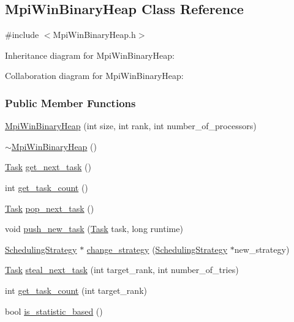 \hypertarget{a00055}{}\subsection{Mpi\+Win\+Binary\+Heap Class Reference}
\label{a00055}


{\ttfamily \#include $<$Mpi\+Win\+Binary\+Heap.\+h$>$}



Inheritance diagram for Mpi\+Win\+Binary\+Heap\+:


Collaboration diagram for Mpi\+Win\+Binary\+Heap\+:
\subsubsection*{Public Member Functions}
\begin{DoxyCompactItemize}
\item 
\hyperlink{a00055_a4a5fd6d6bbb17dae222b879232d11374}{Mpi\+Win\+Binary\+Heap} (int size, int rank, int number\+\_\+of\+\_\+processors)
\item 
\hyperlink{a00055_a907d0f48eee11b2563569fc51b6b3b6c}{$\sim$\+Mpi\+Win\+Binary\+Heap} ()
\item 
\hyperlink{a00002}{Task} \hyperlink{a00055_a380cd524e7944a34b62e1f24e9e177dc}{get\+\_\+next\+\_\+task} ()
\item 
int \hyperlink{a00055_a5b1e74e642f812a39a5aa6a780767361}{get\+\_\+task\+\_\+count} ()
\item 
\hyperlink{a00002}{Task} \hyperlink{a00055_a7320931203f8f33f3bc22bd7d91106f7}{pop\+\_\+next\+\_\+task} ()
\item 
void \hyperlink{a00055_a96148127c5d44c8b884a90c204ee8368}{push\+\_\+new\+\_\+task} (\hyperlink{a00002}{Task} task, long runtime)
\item 
\hyperlink{a00076}{Scheduling\+Strategy} $\ast$ \hyperlink{a00055_aff536070d82c0a220436a1c19e07b584}{change\+\_\+strategy} (\hyperlink{a00076}{Scheduling\+Strategy} $\ast$new\+\_\+strategy)
\item 
\hyperlink{a00002}{Task} \hyperlink{a00055_a713a9f45479e2b80a880867bbb003b8d}{steal\+\_\+next\+\_\+task} (int target\+\_\+rank, int number\+\_\+of\+\_\+tries)
\item 
int \hyperlink{a00055_a870ed56e326e732655a4ba14fa47a4cd}{get\+\_\+task\+\_\+count} (int target\+\_\+rank)
\item 
bool \hyperlink{a00055_a72e6b555d122e42f1dd72ea72f626975}{is\+\_\+statistic\+\_\+based} ()
\end{DoxyCompactItemize}
